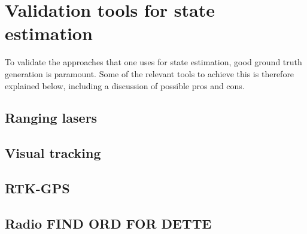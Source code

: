 \section{Validation tools for state estimation}

To validate the approaches that one uses for state estimation, good ground truth generation is paramount. Some of the relevant tools to achieve this is therefore explained below, including a discussion of possible pros and cons.

\subsection{Ranging lasers}



\subsection{Visual tracking}

\subsection{RTK-GPS}

\subsection{Radio FIND ORD FOR DETTE}